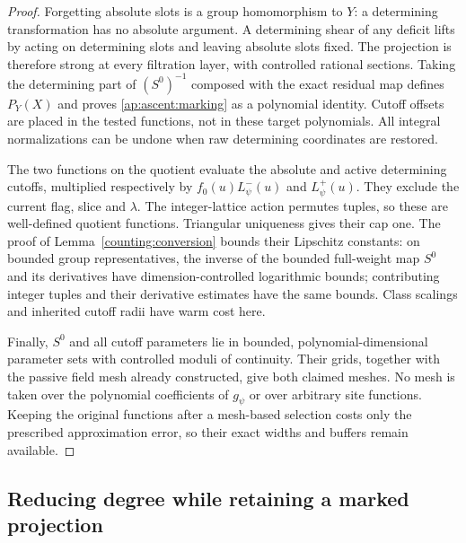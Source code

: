 \begin{proof}
Forgetting absolute slots is a group homomorphism to $Y$: a
determining transformation has no absolute argument.  A determining
shear of any deficit lifts by acting on determining slots and
leaving absolute slots fixed.  The projection is therefore strong
at every filtration layer, with controlled rational sections.
Taking the determining part of $(S^0)^{-1}$ composed with the exact
residual map defines $P_Y(X)$ and proves
\eqref{ap:ascent:marking} as a polynomial identity.  Cutoff offsets
are placed in the tested functions, not in these target polynomials.
All integral normalizations can be undone when raw determining
coordinates are restored.

The two functions on the quotient evaluate the absolute and active
determining cutoffs, multiplied respectively by
$f_0(u)L^-_\psi(u)$ and $L^+_\psi(u)$.  They exclude the current
flag, slice and $\lambda$.  The integer-lattice action permutes
tuples, so these are well-defined quotient functions.  Triangular
uniqueness gives their cap one.  The proof of
Lemma~\ref{counting:conversion} bounds their Lipschitz constants:
on bounded group representatives, the inverse of the bounded
full-weight map $S^0$ and its derivatives have dimension-controlled
logarithmic bounds; contributing integer tuples and their derivative
estimates have the same bounds.  Class scalings and inherited
cutoff radii have warm cost here.

Finally, $S^0$ and all cutoff parameters lie in bounded,
polynomial-dimensional parameter sets with controlled moduli of
continuity.  Their grids, together with the passive field mesh
already constructed, give both claimed meshes.  No mesh is taken
over the polynomial coefficients of $g_\psi$ or over arbitrary
site functions.  Keeping the original functions after a mesh-based
selection costs only the prescribed approximation error, so their
exact widths and buffers remain available.
\end{proof}

\subsection{Reducing degree while retaining a marked projection}

